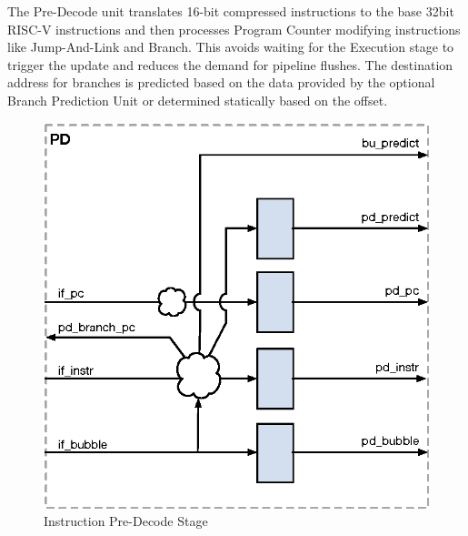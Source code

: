The Pre-Decode unit translates 16-bit compressed instructions to the base 32bit RISC-V instructions and then processes Program Counter modifying instructions like Jump-And-Link and Branch.
This avoids waiting for the Execution stage to trigger the update and reduces the demand for pipeline flushes.
The destination address for branches is predicted based on the data provided by the optional Branch Prediction Unit or determined statically based on the offset.


\begin{figure}[th]
  \includegraphics{assets/img/Pipeline-PD}
  \caption{Instruction Pre-Decode Stage}
\end{figure}

